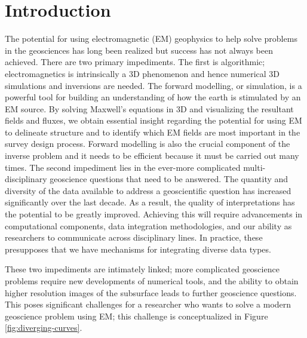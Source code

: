 \documentclass[paper]{geophysics}
\begin{document}
\renewcommand{\figdir}{./figures} %

\section{Introduction}

The potential for using electromagnetic (EM) geophysics to help solve problems in the geosciences has long been realized but success has not always been achieved. There are two primary impediments. The first is algorithmic; electromagnetics is intrinsically a 3D phenomenon and hence numerical 3D simulations and inversions are needed. The forward modelling, or simulation, is a powerful tool for building an understanding of how the earth is stimulated by an EM source. By solving Maxwell's equations in 3D and visualizing the resultant fields and fluxes, we obtain essential insight regarding the potential for using EM to delineate structure and to identify which EM fields are most important in the survey design process. Forward modelling is also the crucial component of the inverse problem and it needs to be efficient because it must be carried out many times. The second impediment lies in the ever-more complicated multi-disciplinary geoscience questions that need to be answered. The quantity and diversity of the data available to address a geoscientific question has increased significantly over the last decade. As a result, the quality of interpretations has the potential to be greatly improved. Achieving this will require advancements in computational components, data integration methodologies, and our ability as researchers to communicate across disciplinary lines. In practice, these presupposes that we have mechanisms for integrating diverse data types.

These two impediments are intimately linked; more complicated geoscience problems require new developments of numerical tools, and the ability to obtain higher resolution images of the subsurface leads to further geoscience questions. This poses significant challenges for a researcher who wants to solve a modern geoscience problem using EM; this challenge is conceptualized in Figure \ref{fig:diverging-curves}.



\end{document}
